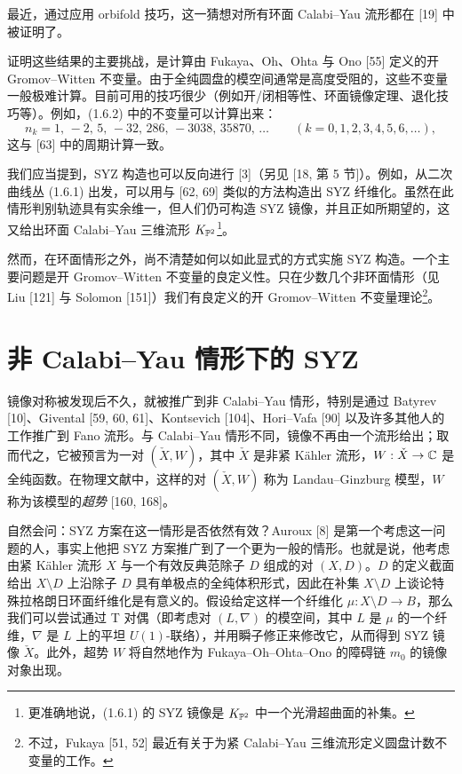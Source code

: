 最近，通过应用 orbifold 技巧，这一猜想对所有环面 Calabi--Yau 流形都在 [19] 中被证明了。

证明这些结果的主要挑战，是计算由 Fukaya、Oh、Ohta 与 Ono [55] 定义的开 Gromov--Witten 不变量。由于全纯圆盘的模空间通常是高度受阻的，这些不变量一般极难计算。目前可用的技巧很少（例如开/闭相等性、环面镜像定理、退化技巧等）。例如，(1.6.2) 中的不变量可以计算出来：
\[
  n_k = 1,\,-2,\,5,\,-32,\,286,\,-3038,\,35870,\,\dots
  \qquad (k=0,1,2,3,4,5,6,\dots),
\]
这与 [63] 中的周期计算一致。

我们应当提到，SYZ 构造也可以反向进行 [3]（另见 [18, 第 5 节]）。例如，从二次曲线丛 (1.6.1) 出发，可以用与 [62, 69] 类似的方法构造出 SYZ 纤维化。虽然在此情形判别轨迹具有实余维一，但人们仍可构造 SYZ 镜像，并且正如所期望的，这又给出环面 Calabi--Yau 三维流形 $K_{\mathbb{P}^2}$\footnote{更准确地说，(1.6.1) 的 SYZ 镜像是 $K_{\mathbb{P}^2}$ 中一个光滑超曲面的补集。}。

然而，在环面情形之外，尚不清楚如何以如此显式的方式实施 SYZ 构造。一个主要问题是开 Gromov--Witten 不变量的良定义性。只在少数几个非环面情形（见 Liu [121] 与 Solomon [151]）我们有良定义的开 Gromov--Witten 不变量理论\footnote{不过，Fukaya [51, 52] 最近有关于为紧 Calabi--Yau 三维流形定义圆盘计数不变量的工作。}。

\section{非 Calabi--Yau 情形下的 SYZ}
镜像对称被发现后不久，就被推广到非 Calabi--Yau 情形，特别是通过 Batyrev [10]、Givental [59, 60, 61]、Kontsevich [104]、Hori--Vafa [90] 以及许多其他人的工作推广到 Fano 流形。与 Calabi--Yau 情形不同，镜像不再由一个流形给出；取而代之，它被预言为一对 $(\check X,W)$，其中 $\check X$ 是非紧 K\"ahler 流形，$W : \check X \to \mathbb{C}$ 是全纯函数。在物理文献中，这样的对 $(\check X,W)$ 称为 Landau--Ginzburg 模型，$W$ 称为该模型的\emph{超势} [160, 168]。

自然会问：SYZ 方案在这一情形是否依然有效？Auroux [8] 是第一个考虑这一问题的人，事实上他把 SYZ 方案推广到了一个更为一般的情形。也就是说，他考虑由紧 K\"ahler 流形 $X$ 与一个有效反典范除子 $D$ 组成的对 $(X,D)$。$D$ 的定义截面给出 $X \setminus D$ 上沿除子 $D$ 具有单极点的全纯体积形式，因此在补集 $X \setminus D$ 上谈论特殊拉格朗日环面纤维化是有意义的。假设给定这样一个纤维化 $\mu : X \setminus D \to B$，那么我们可以尝试通过 T 对偶（即考虑对 $(L,\nabla)$ 的模空间，其中 $L$ 是 $\mu$ 的一个纤维，$\nabla$ 是 $L$ 上的平坦 $U(1)$-联络），并用瞬子修正来修改它，从而得到 SYZ 镜像 $\check X$。此外，超势 $W$ 将自然地作为 Fukaya--Oh--Ohta--Ono 的障碍链 $m_0$ 的镜像对象出现。

